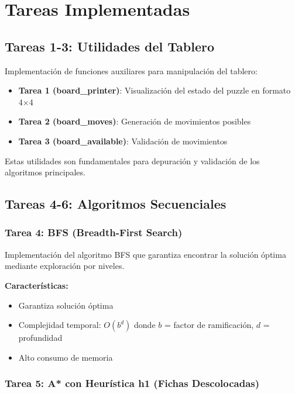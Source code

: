 \documentclass[12pt,a4paper]{article}
\begin{document}
\section{Tareas Implementadas}

\subsection{Tareas 1-3: Utilidades del Tablero}

Implementación de funciones auxiliares para manipulación del tablero:

\begin{itemize}
    \item \textbf{Tarea 1 (board\_printer)}: Visualización del estado del puzzle en formato 4×4
    \item \textbf{Tarea 2 (board\_moves)}: Generación de movimientos posibles
    \item \textbf{Tarea 3 (board\_available)}: Validación de movimientos
\end{itemize}

Estas utilidades son fundamentales para depuración y validación de los algoritmos principales.

\subsection{Tareas 4-6: Algoritmos Secuenciales}

\subsubsection{Tarea 4: BFS (Breadth-First Search)}

Implementación del algoritmo BFS que garantiza encontrar la solución óptima mediante exploración por niveles.

\textbf{Características:}
\begin{itemize}
    \item Garantiza solución óptima
    \item Complejidad temporal: $O(b^d)$ donde $b$ = factor de ramificación, $d$ = profundidad
    \item Alto consumo de memoria
\end{itemize}

\subsubsection{Tarea 5: A* con Heurística h1 (Fichas Descolocadas)}
\end{document}
